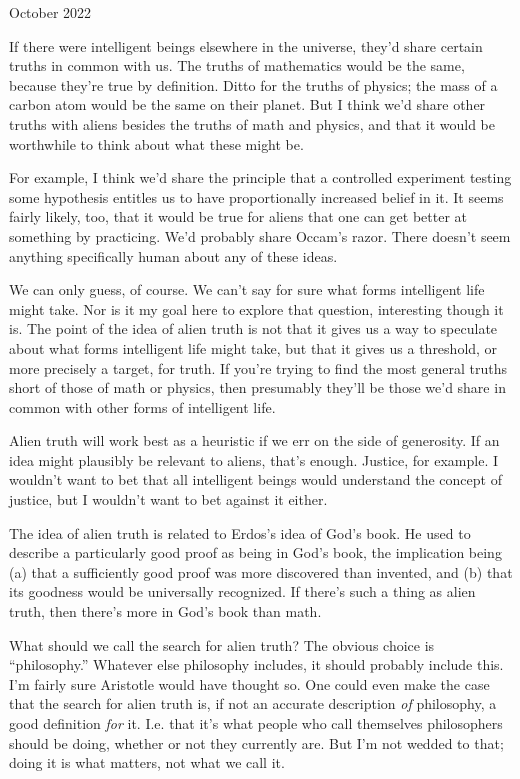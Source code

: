 October 2022

If there were intelligent beings elsewhere in the universe, they'd share
certain truths in common with us. The truths of mathematics would be the
same, because they're true by definition. Ditto for the truths of
physics; the mass of a carbon atom would be the same on their planet.
But I think we'd share other truths with aliens besides the truths of
math and physics, and that it would be worthwhile to think about what
these might be.

For example, I think we'd share the principle that a controlled
experiment testing some hypothesis entitles us to have proportionally
increased belief in it. It seems fairly likely, too, that it would be
true for aliens that one can get better at something by practicing. We'd
probably share Occam's razor. There doesn't seem anything specifically
human about any of these ideas.

We can only guess, of course. We can't say for sure what forms
intelligent life might take. Nor is it my goal here to explore that
question, interesting though it is. The point of the idea of alien truth
is not that it gives us a way to speculate about what forms intelligent
life might take, but that it gives us a threshold, or more precisely a
target, for truth. If you're trying to find the most general truths
short of those of math or physics, then presumably they'll be those we'd
share in common with other forms of intelligent life.

Alien truth will work best as a heuristic if we err on the side of
generosity. If an idea might plausibly be relevant to aliens, that's
enough. Justice, for example. I wouldn't want to bet that all
intelligent beings would understand the concept of justice, but I
wouldn't want to bet against it either.

The idea of alien truth is related to Erdos's idea of God's book. He
used to describe a particularly good proof as being in God's book, the
implication being (a) that a sufficiently good proof was more discovered
than invented, and (b) that its goodness would be universally
recognized. If there's such a thing as alien truth, then there's more in
God's book than math.

What should we call the search for alien truth? The obvious choice is
``philosophy.'' Whatever else philosophy includes, it should probably
include this. I'm fairly sure Aristotle would have thought so. One could
even make the case that the search for alien truth is, if not an
accurate description \emph{of} philosophy, a good definition \emph{for}
it. I.e. that it's what people who call themselves philosophers should
be doing, whether or not they currently are. But I'm not wedded to that;
doing it is what matters, not what we call it.

